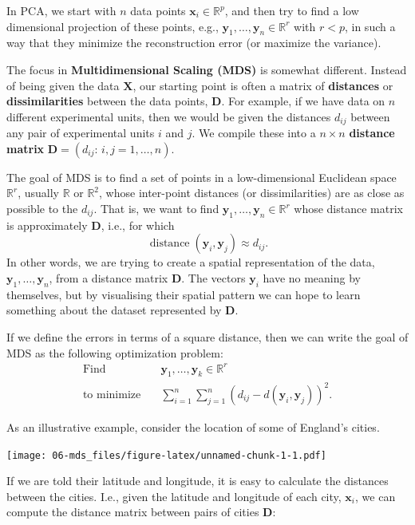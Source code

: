 \documentclass[
]{book}
\theoremstyle{definition}
\theoremstyle{definition}
\theoremstyle{definition}
\theoremstyle{definition}
\theoremstyle{remark}
\begin{document}
In PCA, we start with \(n\) data points \(\mathbf x_i \in \mathbb{R}^p\), and then try to find a low dimensional projection of these points, e.g., \(\mathbf y_1, \ldots, \mathbf y_n \in \mathbb{R}^r\) with \(r<p\), in such a way that they minimize the reconstruction error (or maximize the variance).

The focus in \textbf{Multidimensional Scaling (MDS)} is somewhat different. Instead of being given the data \(\mathbf X\), our starting point is often a matrix of \textbf{distances} or \textbf{dissimilarities} between the data points, \(\mathbf D\). For example, if we have data on \(n\) different experimental units, then we would be given the distances \(d_{ij}\) between any pair of experimental units \(i\) and \(j\). We compile these into a \(n\times n\) \textbf{distance matrix} \(\mathbf D=(d_{ij}: \, i,j=1, \ldots , n)\).

The goal of MDS is to find a set of points in a low-dimensional Euclidean space \(\mathbb{R}^r\), usually \(\mathbb{R}\) or \(\mathbb{R}^2\), whose inter-point distances (or dissimilarities) are as close as possible to the \(d_{ij}\). That is, we want to find \(\mathbf y_1, \ldots, \mathbf y_n \in \mathbb{R}^r\) whose distance matrix is approximately \(\mathbf D\), i.e., for which
\[\operatorname{distance}(\mathbf y_i, \mathbf y_j) \approx d_{ij}.\]
In other words, we are trying to create a spatial representation of the data, \(\mathbf y_1, \ldots, \mathbf y_n\), from a distance matrix \(\mathbf D\). The vectors \(\mathbf y_i\) have no meaning by themselves, but by visualising their spatial pattern we can hope to learn something about the dataset represented by \(\mathbf D\).

If we define the errors in terms of a square distance, then we can write the goal of MDS as the following optimization problem:
\begin{align}
\mbox{Find} \quad& \mathbf y_1, \ldots, \mathbf y_k \in \mathbb{R}^r\\
\mbox{to minimize} \quad &\sum_{i=1}^n \sum_{j=1}^n (d_{ij} - d(\mathbf y_i, \mathbf y_j))^2.\label{eq:mdsopt}
\end{align}

As an illustrative example, consider the location of some of England's cities.

\texttt{[image: 06-mds\_files/figure-latex/unnamed-chunk-1-1.pdf]}

If we are told their latitude and longitude, it is easy to calculate the distances between the cities. I.e., given the latitude and longitude of each city, \(\mathbf x_i\), we can compute the distance matrix between pairs of cities \(\mathbf D\):
\end{document}
